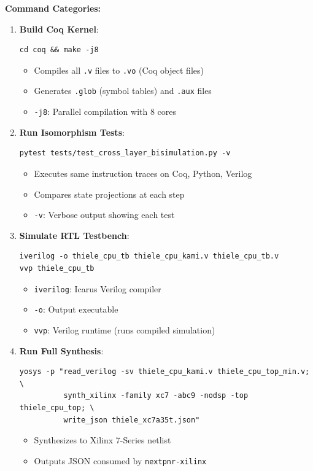 \textbf{Command Categories:}
\begin{enumerate}
    \item \textbf{Build Coq Kernel}:
    \begin{verbatim}
cd coq && make -j8
    \end{verbatim}
    \begin{itemize}
        \item Compiles all \texttt{.v} files to \texttt{.vo} (Coq object files)
        \item Generates \texttt{.glob} (symbol tables) and \texttt{.aux} files
        \item \texttt{-j8}: Parallel compilation with 8 cores
    \end{itemize}

    \item \textbf{Run Isomorphism Tests}:
    \begin{verbatim}
pytest tests/test_cross_layer_bisimulation.py -v
    \end{verbatim}
    \begin{itemize}
        \item Executes same instruction traces on Coq, Python, Verilog
        \item Compares state projections at each step
        \item \texttt{-v}: Verbose output showing each test
    \end{itemize}

    \item \textbf{Simulate RTL Testbench}:
    \begin{verbatim}
iverilog -o thiele_cpu_tb thiele_cpu_kami.v thiele_cpu_tb.v
vvp thiele_cpu_tb
    \end{verbatim}
    \begin{itemize}
        \item \texttt{iverilog}: Icarus Verilog compiler
        \item \texttt{-o}: Output executable
        \item \texttt{vvp}: Verilog runtime (runs compiled simulation)
    \end{itemize}

    \item \textbf{Run Full Synthesis}:
    \begin{verbatim}
yosys -p "read_verilog -sv thiele_cpu_kami.v thiele_cpu_top_min.v; \
          synth_xilinx -family xc7 -abc9 -nodsp -top thiele_cpu_top; \
          write_json thiele_xc7a35t.json"
    \end{verbatim}
    \begin{itemize}
        \item Synthesizes to Xilinx 7-Series netlist
        \item Outputs JSON consumed by \texttt{nextpnr-xilinx}
    \end{itemize}
\end{enumerate}

